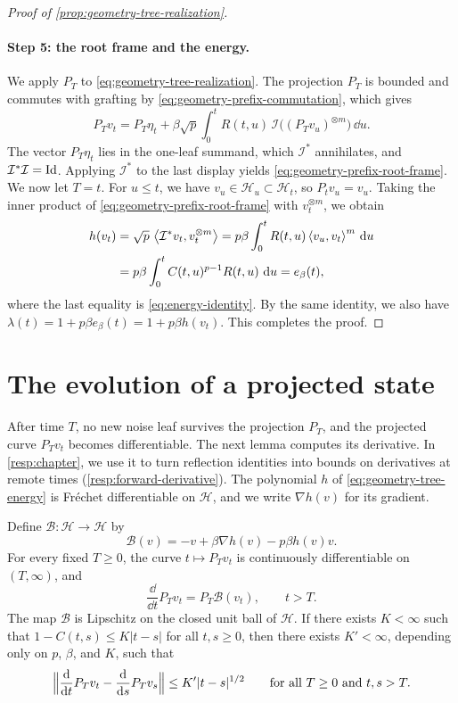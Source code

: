 \begin{proof}[Proof of \cref{prop:geometry-tree-realization}]
\paragraph{Step 5: the root frame and the energy.}
We apply $P_T$ to \eqref{eq:geometry-tree-realization}. The projection $P_T$ is bounded and commutes with grafting by \eqref{eq:geometry-prefix-commutation}, which gives
\[
 P_Tv_t=P_T\eta_t+\beta\sqrt p\int_0^tR(t,u)\,\mathcal I\bigl((P_Tv_u)^{\otimes m}\bigr)\,\dd u.
\]
The vector $P_T\eta_t$ lies in the one-leaf summand, which $\mathcal I^*$ annihilates, and $\mathcal I^*\mathcal I=\operatorname{Id}$. Applying $\mathcal I^*$ to the last display yields \eqref{eq:geometry-prefix-root-frame}. We now let $T=t$. For $u\le t$, we have $v_u\in\mathcal H_u\subset\mathcal H_t$, so $P_tv_u=v_u$. Taking the inner product of \eqref{eq:geometry-prefix-root-frame} with $v_t^{\otimes m}$, we obtain
\[
\begin{aligned}
 h(v_t)&=\sqrt p\,\left\langle\mathcal I^*v_t,v_t^{\otimes m}\right\rangle
 =p\beta\int_0^tR(t,u)\left\langle v_u,v_t\right\rangle^m\,\mathop{}\!\mathrm d u\\
 &=p\beta\int_0^tC(t,u)^{p-1}R(t,u)\,\mathop{}\!\mathrm d u
 =e_\beta(t),
\end{aligned}
\]
where the last equality is \eqref{eq:energy-identity}. By the same identity, we also have $\lambda(t)=1+p\beta e_\beta(t)=1+p\beta h(v_t)$. This completes the proof.
\end{proof}

\section{The evolution of a projected state}\label{sec:tree-projected-drift}

After time $T$, no new noise leaf survives the projection $P_T$, and the projected curve $P_Tv_t$ becomes differentiable. The next lemma computes its derivative. In \cref{resp:chapter}, we use it to turn reflection identities into bounds on derivatives at remote times (\cref{resp:forward-derivative}). The polynomial $h$ of \eqref{eq:geometry-tree-energy} is Fr\'echet differentiable on $\mathcal H$, and we write $\nabla h(v)$ for its gradient.

\begin{lemma}
\label{lem:geometry-projected-drift}
Define $\mathcal B\colon\mathcal H\to\mathcal H$ by
\[
 \mathcal B(v)=-v+\beta\nabla h(v)-p\beta h(v)v.
\]
For every fixed $T\ge0$, the curve $t\mapsto P_Tv_t$ is continuously differentiable on $(T,\infty)$, and
\begin{equation}
 \frac{\dd}{\dd t}P_Tv_t=P_T\mathcal B(v_t),\qquad t>T.
 \label{eq:geometry-projected-drift}
\end{equation}
The map $\mathcal B$ is Lipschitz on the closed unit ball of $\mathcal H$. If there exists $K<\infty$ such that $1-C(t,s)\le K|t-s|$ for all $t,s\ge0$, then there exists $K'<\infty$, depending only on $p$, $\beta$, and $K$, such that
\[
 \Bigl\|\frac{\mathop{}\!\mathrm d}{\mathop{}\!\mathrm d t}P_Tv_t-\frac{\mathop{}\!\mathrm d}{\mathop{}\!\mathrm d s}P_Tv_s\Bigr\|\le K'|t-s|^{1/2}
 \qquad\text{for all }T\ge0\text{ and }t,s>T.
\]
\end{lemma}

